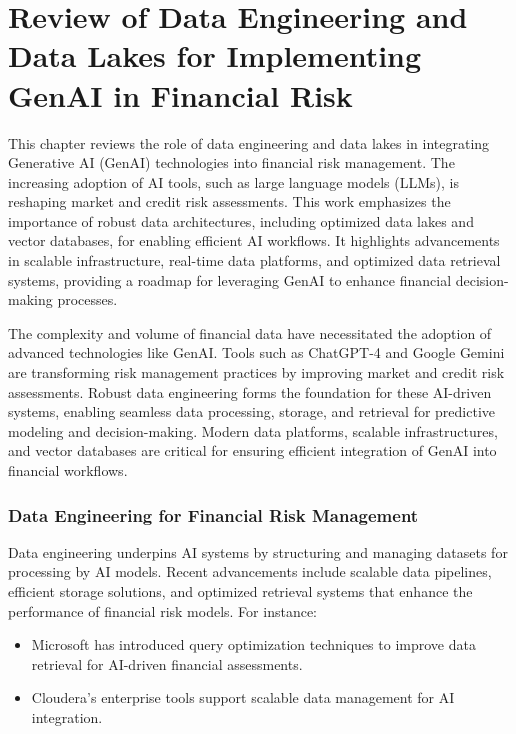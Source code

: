 \documentclass[a4paper,headinclude=on,footinclude=on,12pt,oneside]{scrbook}
\begin{document}
	\chapter{Review of Data Engineering and Data Lakes for Implementing GenAI in Financial Risk}
	
	This chapter reviews the role of data engineering and data lakes in integrating Generative AI (GenAI) technologies into financial risk management. The increasing adoption of AI tools, such as large language models (LLMs), is reshaping market and credit risk assessments. This work emphasizes the importance of robust data architectures, including optimized data lakes and vector databases, for enabling efficient AI workflows. It highlights advancements in scalable infrastructure, real-time data platforms, and optimized data retrieval systems, providing a roadmap for leveraging GenAI to enhance financial decision-making processes.
	
	The complexity and volume of financial data have necessitated the adoption of advanced technologies like GenAI. Tools such as ChatGPT-4 and Google Gemini are transforming risk management practices by improving market and credit risk assessments. Robust data engineering forms the foundation for these AI-driven systems, enabling seamless data processing, storage, and retrieval for predictive modeling and decision-making. Modern data platforms, scalable infrastructures, and vector databases are critical for ensuring efficient integration of GenAI into financial workflows.
	
	\subsection{Data Engineering for Financial Risk Management}
	Data engineering underpins AI systems by structuring and managing datasets for processing by AI models. Recent advancements include scalable data pipelines, efficient storage solutions, and optimized retrieval systems that enhance the performance of financial risk models. For instance:
	\begin{itemize}
		\item Microsoft has introduced query optimization techniques to improve data retrieval for AI-driven financial assessments.
		\item Cloudera's enterprise tools support scalable data management for AI integration.
	\end{itemize}
	
\end{document}
